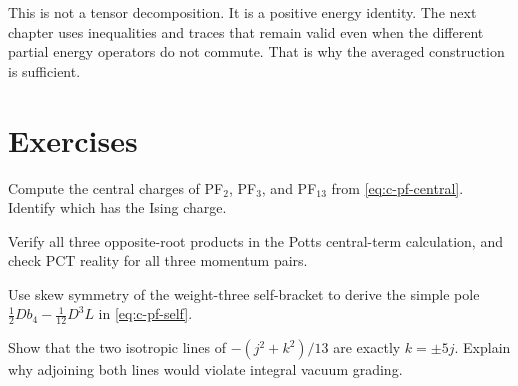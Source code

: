 This is not a tensor decomposition. It is a positive energy identity.
The next chapter uses inequalities and traces that remain valid even
when the different partial energy operators do not commute. That is
why the averaged construction is sufficient.

\section{Exercises}

\begin{exercise}\label{ex:c-factors-1}
Compute the central charges of PF$_2$, PF$_3$, and PF$_{13}$ from
\eqref{eq:c-pf-central}. Identify which has the Ising charge.

\par\smallskip{}\par
\end{exercise}
\begin{exercise}\label{ex:c-factors-2}
Verify all three opposite-root products in the Potts central-term
calculation, and check PCT reality for all three momentum pairs.

\par\smallskip{}\par
\end{exercise}
\begin{exercise}\label{ex:c-factors-3}
Use skew symmetry of the weight-three self-bracket to derive the simple
pole $\tfrac12Db_4-\tfrac1{12}D^3L$ in
\eqref{eq:c-pf-self}.

\par\smallskip{}\par
\end{exercise}
\begin{exercise}\label{ex:c-factors-4}
Show that the two isotropic lines of $-(j^2+k^2)/13$ are exactly
$k=\pm5j$. Explain why adjoining both lines would violate integral
vacuum grading.

\par\smallskip{}\par
\end{exercise}
